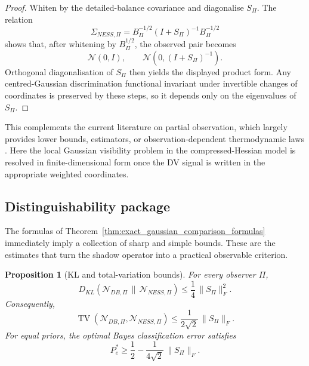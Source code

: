 \documentclass[11pt,a4paper]{article}
\numberwithin{equation}{section}
\theoremstyle{thmcompact}
\newtheorem{proposition}[theorem]{Proposition}
\theoremstyle{remark}
\begin{document}
\begin{proof}
Whiten by the detailed-balance covariance and diagonalise \(S_\Pi\). The relation
\begin{equation}
\Sigma_{NESS,\Pi}
=
B_\Pi^{-1/2}(I+S_\Pi)^{-1}B_\Pi^{-1/2}
\end{equation}
shows that, after whitening by \(B_\Pi^{1/2}\), the observed pair becomes
\begin{equation}
\mathcal N(0,I),
\qquad
\mathcal N\!\left(0,(I+S_\Pi)^{-1}\right).
\end{equation}
Orthogonal diagonalisation of \(S_\Pi\) then yields the displayed product form. Any centred-Gaussian discrimination functional invariant under invertible changes of coordinates is preserved by these steps, so it depends only on the eigenvalues of \(S_\Pi\).
\end{proof}


This complements the current literature on partial observation, which largely provides lower bounds, estimators, or observation-dependent thermodynamic laws \cite{BaiesiNishiyamaFalasco2023,BlomSongVougaGodecMakarov2025,FritzErtelSeifert2024,Harunari2024,RubinoBruknerManzano2025,vanderMeerSaito2025}. Here the local Gaussian visibility problem in the compressed-Hessian model is resolved in finite-dimensional form once the DV signal is written in the appropriate weighted coordinates.

\subsection{Distinguishability package}

The formulas of Theorem~\ref{thm:exact_gaussian_comparison_formulas} immediately imply a collection of sharp and simple bounds. These are the estimates that turn the shadow operator into a practical observable criterion.

\begin{proposition}[KL and total-variation bounds]
\label{prop:kl_tv_bounds}
For every observer \(\Pi\),
\begin{equation}
D_{KL}\!\left(\mathcal N_{DB,\Pi}\,\|\,\mathcal N_{NESS,\Pi}\right)
\le
\frac14\,\|S_\Pi\|_F^2.
\end{equation}
Consequently,
\begin{equation}
\operatorname{TV}\!\left(\mathcal N_{DB,\Pi},\mathcal N_{NESS,\Pi}\right)
\le
\frac{1}{2\sqrt2}\,\|S_\Pi\|_F.
\end{equation}
For equal priors, the optimal Bayes classification error satisfies
\begin{equation}
P_e^\ast
\ge
\frac12-\frac{1}{4\sqrt2}\,\|S_\Pi\|_F.
\end{equation}
\end{proposition}
\end{document}
